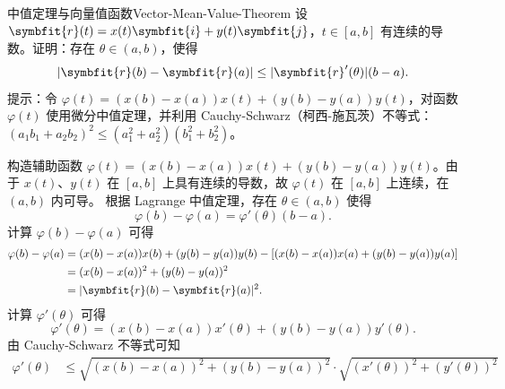 \begin{problem}{中值定理与向量值函数}{Vector-Mean-Value-Theorem}
    设 $\symbfit{r}(t) = x(t)\symbfit{i} + y(t)\symbfit{j}$，$t \in [a, b]$ 有连续的导数。证明：存在 $\theta \in (a, b)$，使得
    \begin{equation}
        |\symbfit{r}(b) - \symbfit{r}(a)| \le |\symbfit{r}'(\theta)|(b - a). \label{eq:target-inequality}
    \end{equation}
    提示：令 $\varphi(t) = (x(b) - x(a))x(t) + (y(b) - y(a))y(t)$，对函数 $\varphi(t)$ 使用微分中值定理，并利用 Cauchy-Schwarz（柯西-施瓦茨）不等式：$(a_1b_1 + a_2b_2)^2 \le (a_1^2 + a_2^2)(b_1^2 + b_2^2)$。
\end{problem}

\begin{myproof}

    构造辅助函数 $\varphi(t) = (x(b) - x(a))x(t) + (y(b) - y(a))y(t)$。由于 $x(t)$、$y(t)$ 在 $[a, b]$ 上具有连续的导数，故 $\varphi(t)$ 在 $[a, b]$ 上连续，在 $(a, b)$ 内可导。
    根据 Lagrange 中值定理，存在 $\theta \in (a, b)$ 使得
    \begin{equation}
        \varphi(b) - \varphi(a) = \varphi'(\theta)(b - a). \label{eq:lagrange}
    \end{equation}
    计算 $\varphi(b) - \varphi(a)$ 可得
    \begin{equation}
        \begin{aligned}
            \varphi(b) - \varphi(a) & = (x(b) - x(a))x(b) + (y(b) - y(a))y(b) - \left[ (x(b) - x(a))x(a) + (y(b) - y(a))y(a) \right] \\
                                    & = (x(b) - x(a))^2 + (y(b) - y(a))^2                                                            \\
                                    & = |\symbfit{r}(b) - \symbfit{r}(a)|^2.
        \end{aligned} \label{eq:left-side}
    \end{equation}
    计算 $\varphi'(\theta)$ 可得
    \begin{equation}
        \varphi'(\theta) = (x(b) - x(a))x'(\theta) + (y(b) - y(a))y'(\theta). \label{eq:derivative}
    \end{equation}
    由 Cauchy-Schwarz 不等式可知
    \begin{equation}
        \begin{aligned}
            \varphi'(\theta) & \le \sqrt{(x(b) - x(a))^2 + (y(b) - y(a))^2} \cdot \sqrt{(x'(\theta))^2 + (y'(\theta))^2} \\

\end{aligned}
\end{equation}
\end{myproof}
